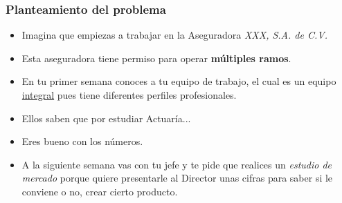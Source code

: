 \begin{frame}
    \frametitle{Planteamiento del problema}
    \begin{itemize}
        \item<1-> Imagina que empiezas a trabajar en la Aseguradora \textit{XXX, S.A. de C.V.}
        \item<2-> Esta aseguradora tiene permiso para operar \textbf{múltiples ramos}. 
        \item<3-> En tu primer semana conoces a tu equipo de trabajo, el cual es un equipo \underline{integral} pues tiene diferentes perfiles profesionales.
        \item<4-> Ellos saben que por estudiar Actuaría...
        \item<5-> Eres bueno con los números.
        \item<6-> A la siguiente semana vas con tu jefe y te pide que realices un \textit{estudio de mercado} porque quiere presentarle al Director unas cifras para saber si le conviene o no, crear cierto producto.
  \end{itemize}
\end{frame}